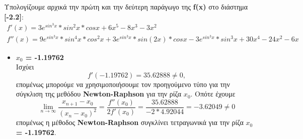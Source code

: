 \documentclass[First Project.tex]{subfiles}
\begin{document}
    Υπολογίζουμε αρχικά την πρώτη και την δεύτερη παράγωγο της \textlatin{\textbf{f(x)}} στο διάστημα \textbf{[-2.2]}:
    \begin{gather*}
            f'(x) = 3e^{sin^{3}x}*sin^{2}x*cosx + 6x^{5} - 8x^{3} -3x^{2} \\
            f''(x) = 9e^{sin^{3}x}*sin^{4}x*cos^{2}x + 3e^{sin^{3}x}*sin(2x)*cosx-3e^{sin^{3}x}*sin^{3}x + 30x^{4} - 24x^{2} - 6x            
    \end{gather*}
    
    \vspace{10mm}
    \begin{itemize}
        \item \textbf{$x_{0}$ = -1.19762} \\
            Ισχύει 
            \begin{equation*}
                f'( -1.19762 ) = 35.62888 \neq 0 ,
            \end{equation*}   
            επομένως μπορούμε να χρησιμοποιήσουμε τον προηγούμενο τύπο για την σύγκλιση της μεθόδου \textlatin{\textbf{Newton-Raphson}} για 
            την ρίζα \textlatin{\textbf{$x_{0}$}}. Οπότε έχουμε
            \begin{equation*}
                \lim_{n\to\infty} \frac{x_{n+1} - x_{0}}{(x_{n} - x_{0})^{2}} = \frac{f''(x_{0})}{2f'(x_{0})} = \frac{35.62888}{-2 * 4.92044} = -3.62049 \neq 0
            \end{equation*}
            επομένως η μέθοδος \textlatin{\textbf{Newton-Raphson}} συγκλίνει τετραγωνικά για την ρίζα \textbf{$x_{0}$ = -1.19762}.
        

\end{itemize}
\end{document}
